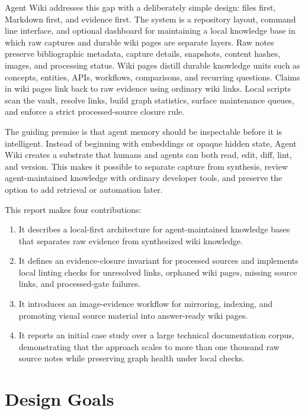\documentclass[10pt]{article}
\begin{document}
Agent Wiki addresses this gap with a deliberately simple design: files first,
Markdown first, and evidence first. The system is a repository layout, command
line interface, and optional dashboard for maintaining a local knowledge base in
which raw captures and durable wiki pages are separate layers. Raw notes preserve
bibliographic metadata, capture details, snapshots, content hashes, images, and
processing status. Wiki pages distill durable knowledge units such as concepts,
entities, APIs, workflows, comparisons, and recurring questions. Claims in wiki
pages link back to raw evidence using ordinary wiki links. Local scripts scan the
vault, resolve links, build graph statistics, surface maintenance queues, and
enforce a strict processed-source closure rule.

The guiding premise is that agent memory should be inspectable before it is
intelligent. Instead of beginning with embeddings or opaque hidden state, Agent
Wiki creates a substrate that humans and agents can both read, edit, diff,
lint, and version. This makes it possible to separate capture from synthesis,
review agent-maintained knowledge with ordinary developer tools, and preserve
the option to add retrieval or automation later.

This report makes four contributions:

\begin{enumerate}[leftmargin=1.5em]
  \item It describes a local-first architecture for agent-maintained knowledge
  bases that separates raw evidence from synthesized wiki knowledge.
  \item It defines an evidence-closure invariant for processed sources and
  implements local linting checks for unresolved links, orphaned wiki pages,
  missing source links, and processed-gate failures.
  \item It introduces an image-evidence workflow for mirroring, indexing, and
  promoting visual source material into answer-ready wiki pages.
  \item It reports an initial case study over a large technical documentation
  corpus, demonstrating that the approach scales to more than one thousand raw
  source notes while preserving graph health under local checks.
\end{enumerate}

\section{Design Goals}
\end{document}
